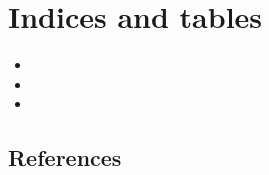 \documentclass[letterpaper,10pt,english,openany,oneside]{sphinxmanual}
\begin{document}
\chapter{Indices and tables}
\label{\detokenize{index:indices-and-tables}}\begin{itemize}
\item {} 

\item {} 

\item {} 

\end{itemize}


\section{References}
\label{\detokenize{index:references}}

\renewcommand{\indexname}{Python Module Index}
\begin{sphinxtheindex}
\let\bigletter\sphinxstyleindexlettergroup
\bigletter{s}
\item\relax{}
\item\relax{}
\end{sphinxtheindex}

\renewcommand{\indexname}{Index}
\printindex
\end{document}
